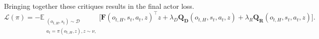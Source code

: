 Bringing together these critiques results in the final actor loss. %
\begin{equation*}\label{eq:actor_loss}
    \mathcal{L}(\pi) = - \mathbb{E}_{\substack{(o_{t, H},s_t) \sim \mathcal{D}\\
    a_{t} = \pi(o_{t, H}, z), z \sim \nu, }} \Big[ \boldsymbol{F}(o_{t, H}, s_t,a_t, z)^\top z + \lambda_D \boldsymbol{Q_D}(o_{t, H}, s_t,a_t, z) + \lambda_R \boldsymbol{Q_R}(o_{t, H}, s_t,a_t, z)\Big].
\end{equation*}



%
%


